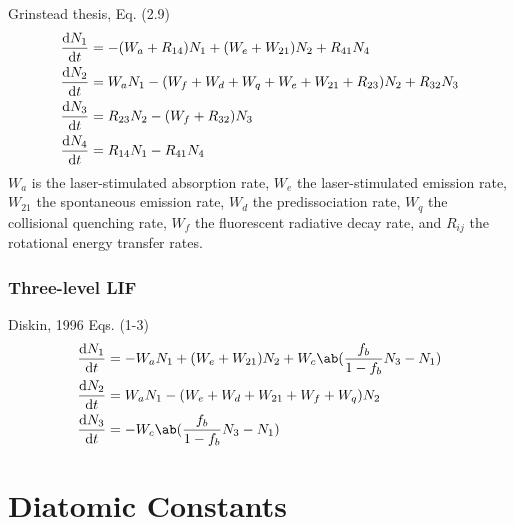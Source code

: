 \documentclass[11pt, twoside, fleqn]{report}
\begin{document}
    Grinstead thesis, Eq. (2.9)
    \begin{align*}
        \odv{N_1}{t} & = -(W_a + R_{14})N_1 + (W_e + W_{21})N_2 + R_{41}N_4                      \\
        \odv{N_2}{t} & = W_aN_1 - (W_f + W_d + W_q + W_e + W_{21} + R_{23})N_2 + R_{32}N_3 \\
        \odv{N_3}{t} & = R_{23}N_2 - (W_f + R_{32})N_3                                               \\
        \odv{N_4}{t} & = R_{14}N_1 - R_{41}N_4
    \end{align*}
    $W_a$ is the laser-stimulated absorption rate, $W_e$ the laser-stimulated emission rate, $W_{21}$ the spontaneous emission rate, $W_d$ the predissociation rate, $W_q$ the collisional quenching rate, $W_f$ the fluorescent radiative decay rate, and $R_{ij}$ the rotational energy transfer rates.

    \subsection{Three-level LIF}

    Diskin, 1996 Eqs. (1-3)
    \begin{align*}
        \odv{N_1}{t} & = -W_aN_1 + (W_e + W_{21})N_2 + W_c\ab(\frac{f_b}{1 - f_b}N_3 - N_1) \\
        \odv{N_2}{t} & = W_aN_1 - (W_e + W_d + W_{21} + W_f + W_q)N_2                           \\
        \odv{N_3}{t} & = -W_c\ab(\frac{f_b}{1 - f_b}N_3 - N_1)
    \end{align*}

    \appendix
    \chapter{Diatomic Constants}
    \label{a:diatomic_constants}
\end{document}
